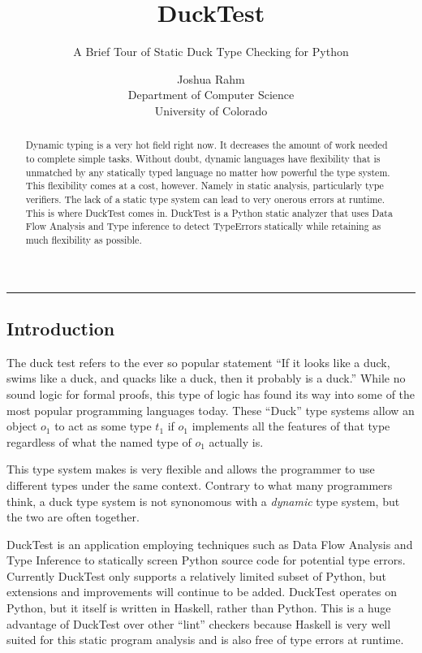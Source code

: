 \documentclass{scrartcl}
\title{DuckTest}
\subtitle{{\textcolor{bardark}{A Brief Tour of Static Duck Type Checking for Python}}}
\author{Joshua Rahm \\
\footnotesize Department of Computer Science \\[2pt]
\footnotesize University of Colorado}
\date{}
\begin{document}
\nocite{*}
\maketitle
\hrule

\begin{multicols}{2}

\begin{abstract}
    Dynamic typing is a very hot field right now. It decreases the amount
    of work needed to complete simple tasks. Without doubt, dynamic languages
    have flexibility that is unmatched by any statically typed language no
    matter how powerful the type system. This flexibility comes at a cost, however.
    Namely in static analysis, particularly type verifiers. The lack of a static
    type system can lead to very onerous errors at runtime. This is where DuckTest
    comes in. DuckTest is a Python static analyzer that uses Data Flow Analysis
    and Type inference to detect TypeErrors statically while retaining as
    much flexibility as possible.
\end{abstract}

\section*{Introduction}

The duck test refers to the ever so popular statement ``If it looks like a duck,
swims like a duck, and quacks like a duck, then it probably is a duck.'' While
no sound logic for formal proofs, this type of logic has found its way into some
of the most popular programming languages today. These ``Duck'' type systems allow
an object $o_1$ to act as some type $t_1$ if $o_1$ implements all the features of
that type regardless of what the named type of $o_1$ actually is.

This type system makes is very flexible and allows the programmer to use
different types under the same context. Contrary to what many programmers
think, a duck type system is not synonomous with a \emph{dynamic} type
system, but the two are often together.

DuckTest is an application employing techniques such as Data Flow Analysis and
Type Inference to statically screen Python source code for potential type errors.
Currently DuckTest only supports a relatively limited subset of Python, but
extensions and improvements will continue to be added. DuckTest operates on Python,
but it itself is written in Haskell, rather than Python. This is a huge advantage
of DuckTest over other ``lint'' checkers because Haskell is very well suited for
this static program analysis and is also free of type errors at runtime.



\end{multicols}
\end{document}
